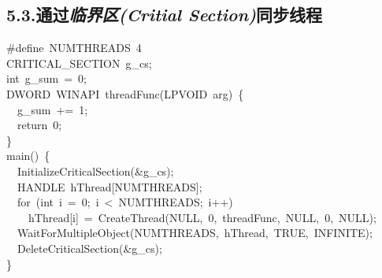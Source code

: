 \documentclass{article}
\begin{document}
\subsection{5.3.\hspace*{0.5em}通过\emph{临界区(Critial Section)}同步线程}\label{sec--critial-section-}%
\begin{mdpre}%
\noindent\#define~{NUMTHREADS}~{4}\\
{CRITICAL\_SECTION}~g\_cs;\\
{int}~g\_sum~=~{0};\\
{DWORD}~{WINAPI}~threadFunc({LPVOID}~arg)~\{\\
~~g\_sum~+=~{1};\\
~~{return}~{0};\\
\}\\
main()~\{\\
~~{InitializeCriticalSection}(\&g\_cs);\\
~~{HANDLE}~hThread[{NUMTHREADS}];\\
~~{for}~({int}~i~=~{0};~i~\textless{}~{NUMTHREADS};~i++)\\
~~~~hThread[i]~=~{CreateThread}({NULL},~{0},~threadFunc,~{NULL},~{0},~{NULL});\\
~~{WaitForMultipleObject}({NUMTHREADS},~hThread,~{TRUE},~{INFINITE});\\
~~{DeleteCriticalSection}(\&g\_cs);\\
\}%
\end{mdpre}
\end{document}

